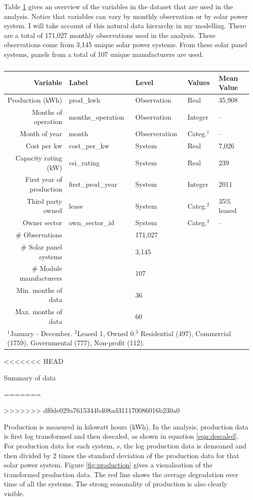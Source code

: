 \documentclass[12pt]{article}
\begin{document}
Table \ref{tbl:variables} gives an overview of the variables in the dataset that are used in the analysis. Notice that variables can vary by monthly observation or by solar power system. I will take account of this natural data hierarchy in my modelling. There are a total of 171,027 monthly observations used in the analysis. These observations come from 3,145 unique solar power systems. From these solar panel systems, panels from a total of 107 unique manufacturers are used.

\begin{table}
  \begin{tabular}{rllll}
  \toprule
    Variable &  Label &   Level & Values &   Mean Value  \\
    \midrule
    Production (kWh) &  prod\_kwh &  Observation & Real & 35,908   \\
    Months of operation &  months\_operation &  Observation & Integer & --   \\
    Month of year & month & Observeration & Categ.$^{1}$& -- \\
    Cost per kw & cost\_per\_kw & System & Real & 7,026 \\
    Capacity rating (kW) & csi\_rating & System & Real & 239 \\
    First year of production & first\_prod\_year & System & Integer & 2011 \\
    Third party owned & lease & System & Categ.$^{2}$  &  35\% leased \\
    Owner sector & own\_sector\_id & System & Categ.$^{3}$& -- \\
    \midrule
    \# Observations && 171,027 && \\
    \# Solar panel systems && 3,145 && \\
    \# Module manufacturers && 107 && \\
     Min. months of data && 36 && \\
     Max. months of data && 60 && \\
  \bottomrule
    \multicolumn{5}{l}{\scriptsize{$^{1}$January - December. $^{2}$Leased 1, Owned 0.$^{3}$ Residential (497), Commercial (1759), Governmental (777), Non-profit (112).}}
  \end{tabular}
  \label{tbl:variables}
<<<<<<< HEAD
  \caption{Summary of data}
=======
  \caption{}
>>>>>>> df0de029a7615344b408ad311170086016b230a0
\end{table}

Production is measured in kilowatt hours (kWh). In the analysis, production data is first log transformed and then descaled, as shown in equation \ref{eqn:descaled}. For production data for each system, $s$, the log production data is demeaned and then divided by 2 times the standard deviation of the production data for that solar power system. Figure \ref{fig:production} gives a visualisation of the transformed production data. The red line shows the average degradation over time of all the systems. The strong seasonality of production is also clearly visible.
\end{document}
